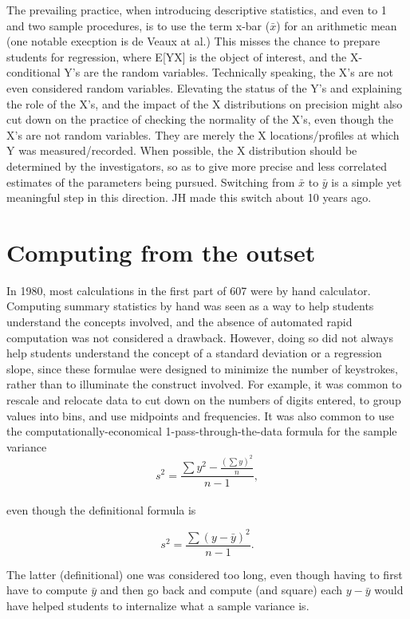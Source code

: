 \documentclass[]{book}
\begin{document}
The prevailing practice, when introducing descriptive statistics, and even to 1 and two sample procedures, is to use the term x-bar (\(\bar{x}\)) for an arithmetic mean (one notable execption is de Veaux at al.) This misses the chance to prepare students for regression, where E{[}Y\textbar{}X{]} is the object of interest, and the X-conditional Y's are the random variables. Technically speaking, the X's are not even considered random variables. Elevating the status of the Y's and explaining the role of the X's, and the impact of the X distributions on precision might also cut down on the practice of checking the normality of the X's, even though the X's are not random variables. They are merely the X locations/profiles at which Y was measured/recorded. When possible, the X distribution should be determined by the investigators, so as to give more precise and less correlated estimates of the parameters being pursued. Switching from \(\bar{x}\) to \(\bar{y}\) is a simple yet meaningful step in this direction. JH made this switch about 10 years ago.

\hypertarget{computing-from-the-outset-1}{%
\section{Computing from the outset}\label{computing-from-the-outset-1}}

In 1980, most calculations in the first part of 607 were by hand calculator. Computing summary statistics by hand was seen as a way to help students understand the concepts involved, and the absence of automated rapid computation was not considered a drawback. However,
doing so did not always help students understand the concept of a standard deviation or a regression slope, since these formulae were designed to minimize the number of keystrokes, rather than to illuminate the construct involved. For example, it was common to rescale and relocate data to cut down on the numbers of digits entered, to group values into bins, and use midpoints and frequencies. It was also common to use the computationally-economical 1-pass-through-the-data formula for the sample variance
\[s^2 =   \frac{ \sum y^2 - \frac{(\sum y)^2}{n}}{n-1},\]\\
even though the definitional formula is

\[s^2 = \frac{\sum(y - \bar{y})^2}{n-1}.\]

The latter (definitional) one was considered too long, even though having to first have to compute \(\bar{y}\) and then go back and compute (and square) each \(y - \bar{y}\) would have helped students to internalize what a sample variance is.
\end{document}
